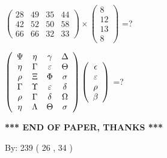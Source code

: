 \documentclass[12pt]{article}
\begin{document}
  
 
$ \left( \begin{array}{ccccccccc}
          28  & 
          49  & 
          35  & 
          44  \\ 
          42  & 
          52  & 
          50  & 
          58  \\ 
          66  & 
          66  & 
          32  & 
          33
\end{array}\right) \times
\left( \begin{array}{c}
           8  \\ 
          12  \\ 
          13  \\ 
           8
\end{array}\right) $ =?
 
 
$  %
 \left( \begin{array}
 {
 c
 c
 c
 c
 }
 \Psi & 
 \eta & 
 \gamma & 
 \Delta \\ 
 \eta & 
 \Gamma & 
 \varepsilon & 
 \Theta \\ 
 \rho & 
                    \Xi & 
 \Phi & 
 \sigma \\ 
 \Gamma & 
 \Upsilon & 
 \varepsilon & 
 \delta \\ 
 \rho & 
 \Gamma & 
 \delta & 
 \Omega \\ 
 \eta & 
 \Lambda & 
 \Theta & 
 \sigma
 \end{array} \right)
 \left( \begin{array}
 {
 c
 }
 \epsilon \\ 
 \varepsilon \\ 
 \rho \\ 
 \beta
 \end{array} \right)
$ =?
 

 

 
\vspace{0.3in}
   
   
 \vspace{0.2in}
 
   
   
   
   
\vspace{1.0in} 
{\textbf{\large{ *** END OF PAPER, THANKS *** }}} 
   
   
\hspace{1.0in} By: 
         239 (          26 ,           34 )
   
   
   
   
\newpage 
\setcounter{page}{ 
    34001 } 
   
\end{document}
